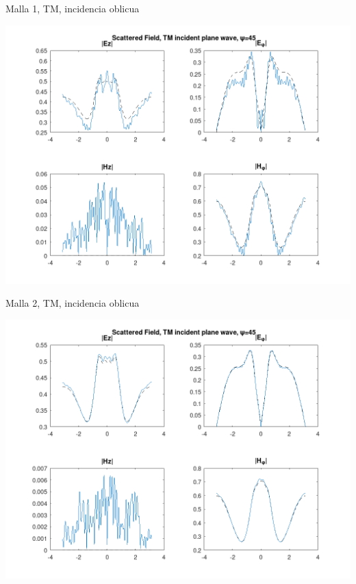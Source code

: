 \documentclass[smaller,xcolor=table,dvipsnames]{beamer}
\begin{document}

\begin{frame}{Malla 1, TM, incidencia oblicua}

\includegraphics[width=0.95\linewidth]{pec_y_malla_gorda_45_TM/NF.png}
  
\end{frame}
  

\begin{frame}{Malla 2, TM, incidencia oblicua}

\includegraphics[width=0.95\linewidth]{pec_y_malla_fina_45_TM/NF.png}
  
\end{frame}
  
\end{document}
